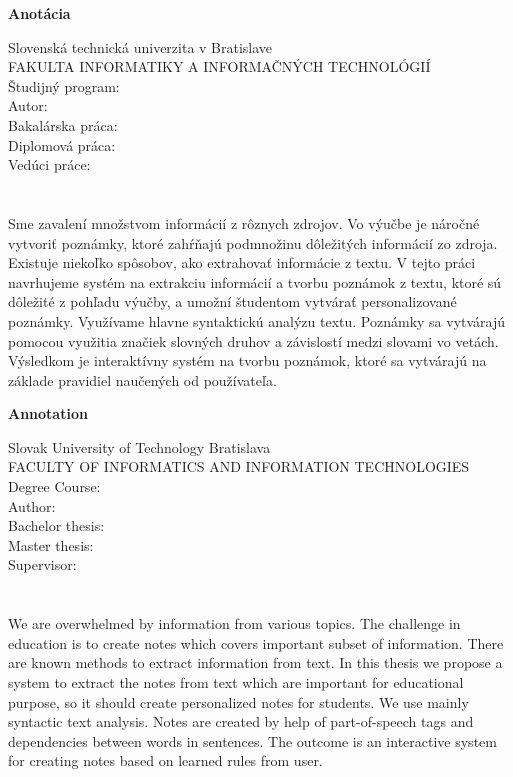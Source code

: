 \newpage
\thispagestyle{plain}
\begin{center}
\begin{Large}
\textbf{Anotácia} \\
\end{Large}
\end{center}
Slovenská technická univerzita v Bratislave \\
FAKULTA INFORMATIKY A INFORMAČNÝCH TECHNOLÓGIÍ \\
\noindent
Študijný program: \Program \\
\noindent
Autor: \Author \\
{
	{Bakalárska práca: }\Title \\
}
{
	{Diplomová práca: }\Title \\
}
Vedúci práce: \Supervisor \\
\Month \Year \\
\noindent
\\
Sme zavalení množstvom informácií z rôznych zdrojov. Vo výučbe je náročné vytvoriť poznámky, ktoré zahŕňajú podmnožinu dôležitých informácií zo zdroja. Existuje niekoľko spôsobov, ako extrahovať informácie z textu. V tejto práci navrhujeme systém na extrakciu informácií a tvorbu poznámok z textu, ktoré sú dôležité z pohľadu výučby, a umožní študentom vytvárať personalizované poznámky. Využívame hlavne syntaktickú analýzu textu. Poznámky sa vytvárajú pomocou využitia značiek slovných druhov a závislostí medzi slovami vo vetách. Výsledkom je interaktívny systém na tvorbu poznámok, ktoré sa vytvárajú na základe pravidiel naučených od používateľa.
\newpage
\thispagestyle{plain}
\begin{center}
\begin{Large}
\textbf{Annotation} \\
\end{Large}
\end{center}
Slovak University of Technology Bratislava \\
FACULTY OF INFORMATICS AND INFORMATION TECHNOLOGIES \\
\noindent
Degree Course: \Program \\
\noindent
Author: \Author \\
{
	{Bachelor thesis: }\Title \\
}
{
	{Master thesis: }\Title \\
}
Supervisor: \Supervisor \\
\Month \Year \\
\noindent
\\
We are overwhelmed by information from various topics. The challenge in education is to create notes which covers important subset of information. There are known methods to extract information from text. In this
thesis we propose a system to extract the notes from text which are important for educational purpose, so it should create personalized notes for students. We use mainly syntactic text analysis. Notes are created by help of part-of-speech tags and dependencies between words in sentences. The outcome is an interactive system for creating notes based on learned rules from user.